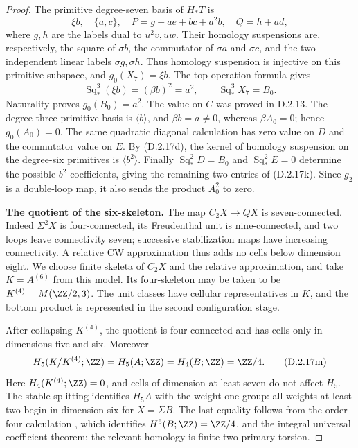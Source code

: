 \begin{proof}
The primitive degree-seven basis of $H_*T$ is
\[
 \xi b,\quad \{a,c\},\quad
 P=g+ae+bc+a^2b,\quad Q=h+ad,
 \tag{D.2.17l}
\]
where $g,h$ are the labels dual to $u^2v,uw$.
Their homology suspensions are, respectively, the square of
$\sigma b$, the commutator of $\sigma a$ and $\sigma c$,
and the two independent linear labels $\sigma g,\sigma h$.
Thus homology suspension is injective on this primitive subspace,
and $g_0(X_7)=\xi b$. The top operation formula gives
\[
 \operatorname{Sq}_*^3(\xi b)=(\beta b)^2=a^2,
 \qquad \operatorname{Sq}_*^3X_7=B_0.
\]
Naturality proves $g_0(B_0)=a^2$. The value on $C$ was proved in
D.2.13. The degree-three primitive basis is $\langle b\rangle$,
and $\beta b=a\ne0$, whereas $\beta A_0=0$; hence $g_0(A_0)=0$.
The same quadratic diagonal calculation has zero value on $D$
and the commutator value on $E$. By \textup{(D.2.17d)}, the
kernel of homology suspension on the degree-six primitives is
$\langle b^2\rangle$. Finally
$\operatorname{Sq}_*^2D=B_0$ and
$\operatorname{Sq}_*^2E=0$ determine the possible $b^2$
coefficients, giving the remaining two entries of
\textup{(D.2.17k)}. Since $g_2$ is a double-loop map, it also sends
the product $A_0^2$ to zero.

\medskip\noindent
\textbf{The quotient of the six-skeleton.}
The map $C_2X\to QX$ is seven-connected. Indeed $\Sigma^2X$ is
four-connected, its Freudenthal unit is nine-connected, and two
loops leave connectivity seven; successive stabilization maps
have increasing connectivity. A relative CW approximation thus
adds no cells below dimension eight. We choose finite skeleta of
$C_2X$ and the relative approximation, and take $K=A^{(6)}$ from
this model. Its four-skeleton may be taken to be
$K^{(4)}=M(\ZZ/2,3)$. The unit classes have cellular representatives
in $K$, and the bottom product is represented in the second
configuration stage.

After collapsing $K^{(4)}$, the quotient is four-connected and
has cells only in dimensions five and six. Moreover
\[
 H_5(K/K^{(4)};\ZZ)=H_5(A;\ZZ)=H_4(B;\ZZ)=\ZZ/4.
 \tag{D.2.17m}
\]
Here $H_4(K^{(4)};\ZZ)=0$, and cells of dimension at least seven
do not affect $H_5$. The stable splitting
\cite[Theorem~1.1 and \S2]{Snaith1974} identifies $H_5A$ with
the weight-one group: all weights at least two begin in dimension
six for $X=\Sigma B$. The last equality follows from the
order-four calculation
\cite[proof in \S6, p.~1340]{I_Mahowald1964}, which identifies
$H^5(B;\ZZ)=\ZZ/4$, and the integral universal coefficient theorem;
the relevant homology is finite two-primary torsion.


\end{proof}
